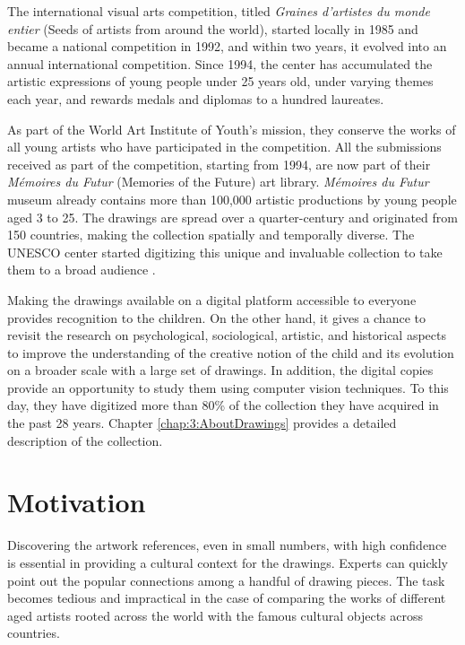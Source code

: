 The international visual arts competition, titled \textit{Graines d’artistes du monde entier} (Seeds of artists from around the world), started locally in 1985 and became a national competition in 1992, and within two years, it evolved into an annual international competition. Since 1994, the center has accumulated the artistic expressions of young people under 25 years old, under varying themes each year, and rewards medals and diplomas to a hundred laureates.

As part of the World Art Institute of Youth's mission, they conserve the works of all young artists who have participated in the competition. All the submissions received as part of the competition, starting from 1994, are now part of their \textit{Mémoires du Futur} (Memories of the Future) art library. \textit{Mémoires du Futur} museum already contains more than 100,000 artistic productions by young people aged 3 to 25. The drawings are spread over a quarter-century and originated from 150 countries, making the collection spatially and temporally diverse. The UNESCO center started digitizing this unique and invaluable collection to take them to a broad audience \cite{centre_unesco_2020}. 

Making the drawings available on a digital platform accessible to everyone provides recognition to the children. On the other hand, it gives a chance to revisit the research on psychological, sociological, artistic, and historical aspects to improve the understanding of the creative notion of the child and its evolution on a broader scale with a large set of drawings. In addition, the digital copies provide an opportunity to study them using computer vision techniques. To this day, they have digitized more than 80\% of the collection they have acquired in the past 28 years. Chapter \ref{chap:3:AboutDrawings} provides a detailed description of the collection.

\section{Motivation}

Discovering the artwork references, even in small numbers, with high confidence is essential in providing a cultural context for the drawings. Experts can quickly point out the popular connections among a handful of drawing pieces. The task becomes tedious and impractical in the case of comparing the works of different aged artists rooted across the world with the famous cultural objects across countries.

